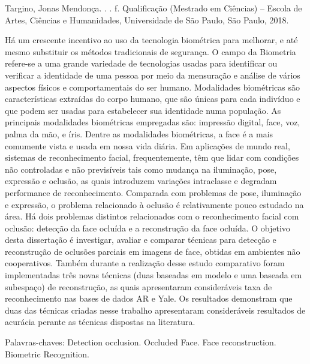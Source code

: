 \begin{resumo}

% 
%
% 
%
\begin{flushleft}
Targino, Jonas Mendonça. \textbf{\imprimirtitulo}. \imprimirdata. \pageref{LastPage} f. Qualificação (Mestrado em Ciências) – Escola de Artes, Ciências e Humanidades, Universidade de São Paulo, São Paulo, 2018.
\end{flushleft}

Há um crescente incentivo ao uso da tecnologia biométrica para melhorar, e até mesmo substituir os métodos tradicionais de segurança. O campo da Biometria refere-se a uma grande variedade de tecnologias usadas para identificar ou verificar a identidade de uma pessoa por meio da mensuração e análise de vários aspectos físicos e comportamentais do ser humano. Modalidades biométricas são características extraídas do corpo humano, que são únicas para cada indivíduo e que podem ser usadas para estabelecer sua identidade numa população. As principais modalidades biométricas empregadas são: impressão digital, face, voz, palma da mão, e íris. Dentre as modalidades biométricas, a face é a mais comumente vista e usada em nossa vida diária. Em aplicações de mundo real, sistemas de reconhecimento facial, frequentemente, têm que lidar com condições não controladas e não previsíveis tais como mudança na iluminação, pose, expressão e oclusão, as quais introduzem variações intraclasse e degradam performance de reconhecimento. Comparada com problemas de pose, iluminação e expressão, o problema relacionado à oclusão é relativamente pouco estudado na área. Há dois problemas distintos relacionados com o reconhecimento facial com oclusão: detecção da face ocluída e a reconstrução da face ocluída. O objetivo desta dissertação é investigar, avaliar e comparar técnicas para detecção e reconstrução de oclusões parciais em imagens de face, obtidas em ambientes não cooperativos. Também durante a realização desse estudo comparativo foram implementadas três novas técnicas (duas baseadas em modelo e uma baseada em subespaço) de reconstrução, as quais apresentaram consideráveis taxa de reconhecimento nas bases de dados AR e Yale. Os resultados demonstram que duas das técnicas criadas nesse trabalho apresentaram consideráveis resultados de acurácia perante as técnicas dispostas na literatura.

Palavras-chaves: Detection occlusion. Occluded Face. Face reconstruction. Biometric Recognition.
\end{resumo}

